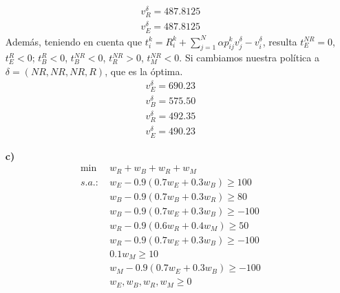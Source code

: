 \documentclass[twoside]{article}
\begin{document}
\begin{ejercicio}{1}
\begin{solucion}
\begin{itemize}
\begin{align*}
v^\delta_R=487.8125\\
v^\delta_E=487.8125
\end{align*}
Además, teniendo en cuenta que $t_i^k= R_i^k + \sum_{j=1}^N \alpha p_{ij}^k v_j^\delta - v_i^\delta$, resulta $t_E^{NR} = 0$, $t_E^R <0$; $t_B^{R}<0$, $t_B^{NR}<0$, $t^{NR}_R >0$, $t^{NR}_M <0$. Si cambiamos nuestra política a $\delta = (NR, NR, NR, R)$, que es la óptima. \begin{align*}
v^\delta_E=690.23\\
v^\delta_B=575.50\\
v^\delta_R=492.35\\
v^\delta_E=490.23
\end{align*}
\item[\textbf{c)}]
\begin{align*}
\min\ & w_R+w_B+w_R+w_M\\
s.a.:\ & w_E - 0.9(0.7w_E+0.3w_B)\geq 100\\
&w_B-0.9(0.7w_B+0.3w_R)\geq 80\\
&w_B-0.9(0.7w_E+0.3w_B)\geq -100\\
&w_R-0.9(0.6w_R+0.4w_M)\geq 50\\
&w_R-0.9(0.7w_E+0.3w_B)\geq -100\\
&0.1w_M\geq 10\\
&w_M-0.9(0.7w_E+0.3w_B)\geq -100\\
&w_E,w_B,w_R,w_M\geq 0
\end{align*}
\end{itemize}
\end{solucion}
\end{ejercicio}
\end{document}
